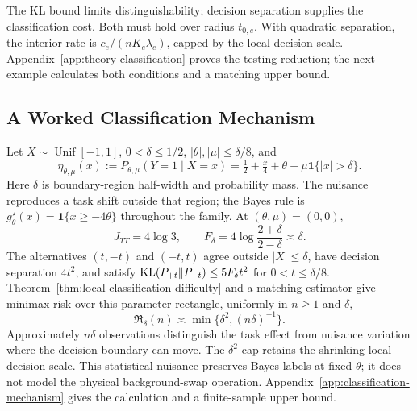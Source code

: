 The KL bound limits distinguishability; decision separation supplies the classification cost. Both must hold over radius $t_{0,e}$. With quadratic separation, the interior rate is $c_e/(nK_e\lambda_e)$, capped by the local decision scale. Appendix~\ref{app:theory-classification} proves the testing reduction; the next example calculates both conditions and a matching upper bound.

\begin{samepage}
\subsection{A Worked Classification Mechanism}
\label{sec:classification-mechanism}
Let $X\sim\operatorname{Unif}[-1,1]$, $0<\delta\le1/2$, $|\theta|,|\mu|\le\delta/8$, and
\begin{equation}
\eta_{\theta,\mu}(x):=P_{\theta,\mu}(Y=1\mid X=x)
=\tfrac12+\tfrac{x}{4}+\theta+\mu\mathbf1\{|x|>\delta\}.
\label{eq:boundary-region-family}
\end{equation}
Here $\delta$ is boundary-region half-width and probability mass. The nuisance reproduces a task shift outside that region; the Bayes rule is $g_\theta^\star(x)=\mathbf1\{x\ge-4\theta\}$ throughout the family. At $(\theta,\mu)=(0,0)$,
\begin{equation}
J_{TT}=4\log3,
\qquad F_\delta=4\log\frac{2+\delta}{2-\delta}\asymp\delta.
\label{eq:boundary-region-information}
\end{equation}
The alternatives $(t,-t)$ and $(-t,t)$ agree outside $|X|\le\delta$, have decision separation $4t^2$, and satisfy $\operatorname{KL}(P_{+t}\Vert P_{-t})\le5F_\delta t^2$ for $0<t\le\delta/8$. Theorem~\ref{thm:local-classification-difficulty} and a matching estimator give minimax risk over this parameter rectangle, uniformly in $n\ge1$ and $\delta$,
\begin{equation}
\mathfrak R_\delta(n)\asymp\min\{\delta^2,(n\delta)^{-1}\}.
\label{eq:boundary-region-minimax-rate}
\end{equation}
Approximately $n\delta$ observations distinguish the task effect from nuisance variation where the decision boundary can move. The $\delta^2$ cap retains the shrinking local decision scale. This statistical nuisance preserves Bayes labels at fixed $\theta$; it does not model the physical background-swap operation. Appendix~\ref{app:classification-mechanism} gives the calculation and a finite-sample upper bound.\par
\end{samepage}

